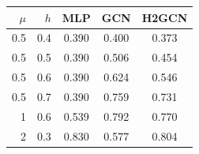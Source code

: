 \begin{tabular}{rrccc}
\toprule
$\mu$ & $h$ & MLP & GCN & H2GCN \\
\midrule
0.5 & 0.4 & 0.390 & 0.400 & 0.373 \\
0.5 & 0.5 & 0.390 & 0.506 & 0.454 \\
0.5 & 0.6 & 0.390 & 0.624 & 0.546 \\
0.5 & 0.7 & 0.390 & 0.759 & 0.731 \\
1 & 0.6 & 0.539 & 0.792 & 0.770 \\
2 & 0.3 & 0.830 & 0.577 & 0.804 \\
\bottomrule
\end{tabular}
